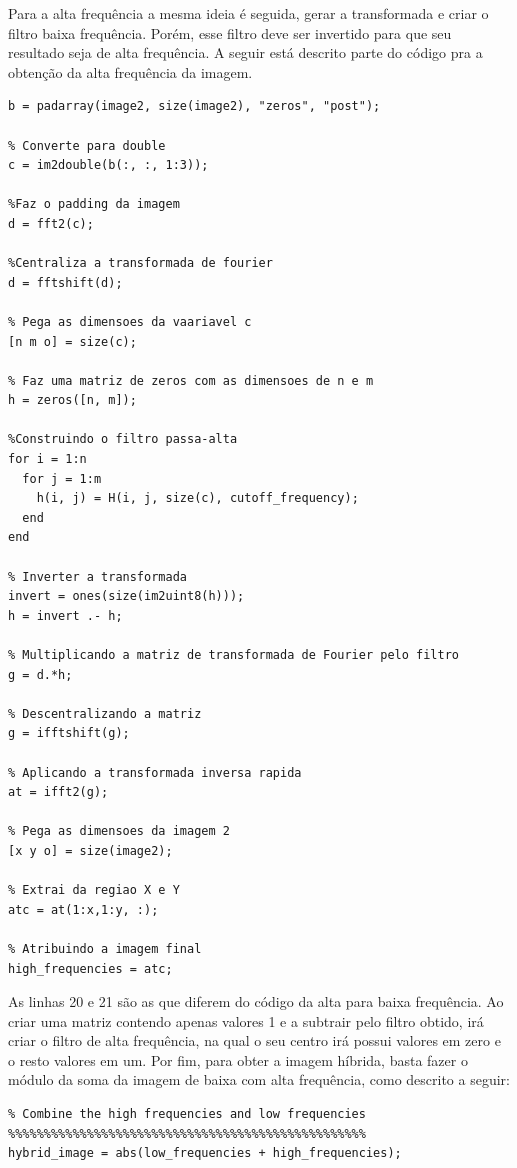 Para a alta frequência a mesma ideia é seguida, gerar a transformada e criar o filtro baixa frequência. Porém, esse filtro deve ser invertido para que seu resultado seja de alta frequência. A seguir está descrito parte do código pra a obtenção da alta frequência da imagem.

\begin{lstlisting}[style=Matlab-editor]
% Cria um padding
b = padarray(image2, size(image2), "zeros", "post");

% Converte para double
c = im2double(b(:, :, 1:3));

%Faz o padding da imagem
d = fft2(c);

%Centraliza a transformada de fourier
d = fftshift(d);

% Pega as dimensoes da vaariavel c
[n m o] = size(c);

% Faz uma matriz de zeros com as dimensoes de n e m
h = zeros([n, m]);

%Construindo o filtro passa-alta
for i = 1:n
  for j = 1:m
    h(i, j) = H(i, j, size(c), cutoff_frequency);
  end
end

% Inverter a transformada
invert = ones(size(im2uint8(h)));
h = invert .- h;

% Multiplicando a matriz de transformada de Fourier pelo filtro
g = d.*h;

% Descentralizando a matriz
g = ifftshift(g);

% Aplicando a transformada inversa rapida
at = ifft2(g);

% Pega as dimensoes da imagem 2
[x y o] = size(image2);

% Extrai da regiao X e Y
atc = at(1:x,1:y, :);

% Atribuindo a imagem final
high_frequencies = atc;
\end{lstlisting}


As linhas 20 e 21 são as que diferem do código da alta para baixa frequência. Ao criar uma matriz contendo apenas valores 1 e a subtrair pelo filtro obtido, irá criar o filtro de alta frequência, na qual o seu centro irá possui valores em zero e o resto valores em um. Por fim, para obter a imagem híbrida, basta fazer o módulo da soma da imagem de baixa com alta frequência, como descrito a seguir:


\begin{lstlisting}[style=Matlab-editor]
%%%%%%%%%%%%%%%%%%%%%%%%%%%%%%%%%%%%%%%%%%%%%%%%%%
% Combine the high frequencies and low frequencies
%%%%%%%%%%%%%%%%%%%%%%%%%%%%%%%%%%%%%%%%%%%%%%%%%%
hybrid_image = abs(low_frequencies + high_frequencies);
\end{lstlisting}


